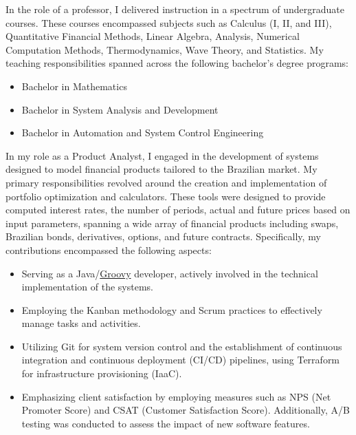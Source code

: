 \documentclass[10pt,a4paper,ragged2e,withhyper,academicons]{altacv}
\begin{document}
\begin{paracol}{1}
\begin{itemize}
\end{itemize}

\divider

In the role of a professor, I delivered instruction in a spectrum of undergraduate courses. These courses encompassed subjects such as Calculus (I, II, and III), Quantitative Financial Methods, Linear Algebra, Analysis, Numerical Computation Methods, Thermodynamics, Wave Theory, and Statistics. My teaching responsibilities spanned across the following bachelor's degree programs:
\begin{itemize}
\item Bachelor in Mathematics 
\item Bachelor in System Analysis and Development
\item Bachelor in Automation and System Control Engineering
\end{itemize}

\divider

In my role as a Product Analyst, I engaged in the development of systems designed to model financial products tailored to the Brazilian market. My primary responsibilities revolved around the creation and implementation of portfolio optimization and calculators. These tools were designed to provide computed interest rates, the number of periods, actual and future prices based on input parameters, spanning a wide array of financial products including swaps, Brazilian bonds, derivatives, options, and future contracts. Specifically, my contributions encompassed the following aspects:

\begin{itemize}
\item Serving as a Java/\href{https://en.wikipedia.org/wiki/Apache_Groovy}{Groovy} developer, actively involved in the technical implementation of the systems.
\item Employing the Kanban methodology and Scrum practices to effectively manage tasks and activities. 
\item Utilizing Git for system version control and the establishment of continuous integration and continuous deployment (CI/CD) pipelines, using Terraform for infrastructure provisioning (IaaC). 
\item Emphasizing client satisfaction by employing measures such as NPS (Net Promoter Score) and CSAT (Customer Satisfaction Score). Additionally, A/B testing was conducted to assess the impact of new software features. 
\end{itemize}


\end{paracol}
\end{document}
